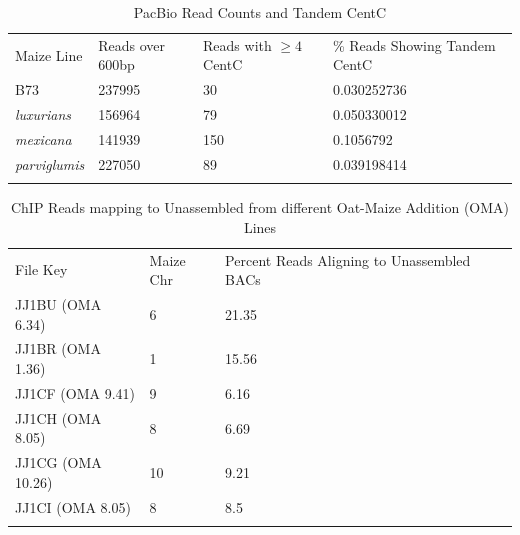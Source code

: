 \begin{table}[h!]
\caption{PacBio Read Counts and Tandem CentC}
\label{supp.pacbio}       %
\begin{tabular}{llll}
\hline\noalign{\smallskip}
Maize Line & Reads over 600bp & Reads with $\geq 4$ CentC & \% Reads Showing Tandem CentC \\
\noalign{\smallskip}\hline\noalign{\smallskip}				
B73	& 237995	& 30	& 0.030252736	\\
\emph{luxurians}		&156964	&	79	&	0.050330012	\\
\emph{mexicana}	 	&141939 	&	150	&	0.1056792	\\
\emph{parviglumis}	&227050	& 89		&	0.039198414	\\
\noalign{\smallskip}\hline
\end{tabular}
\end{table}

\begin{table}[h!]
\caption{ChIP Reads mapping to Unassembled from different Oat-Maize Addition (OMA) Lines}
\label{supp.gaby}       %
\begin{tabular}{llll}
\hline\noalign{\smallskip}
File Key & Maize Chr & Percent Reads Aligning to Unassembled BACs\\
\noalign{\smallskip}\hline\noalign{\smallskip}				
JJ1BU (OMA 6.34) & 6 & 21.35\\
JJ1BR (OMA 1.36) & 1 & 15.56\\
JJ1CF (OMA 9.41) & 9 & 6.16\\
JJ1CH (OMA 8.05) & 8 & 6.69\\
JJ1CG (OMA 10.26) & 10 & 9.21\\
JJ1CI (OMA 8.05) & 8 & 8.5\\
\noalign{\smallskip}\hline
\end{tabular}
\end{table}


